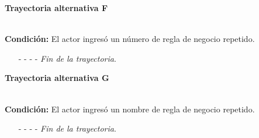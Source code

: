 \hypertarget{CU8-1:TAF}{\textbf{Trayectoria alternativa F}}\\
\noindent \textbf{Condición:} El actor ingresó un número de regla de negocio repetido.
\begin{enumerate}
	\UCpaso[\UCsist] Muestra el mensaje  señalando el campo que presenta la duplicidad en la pantalla .
	\UCpaso Regresa al paso \ref{CU8.1-P3} de la trayectoria principal.
	\item[- -] - - {\em {Fin de la trayectoria}}.
\end{enumerate}

\hypertarget{CU8-1:TAG}{\textbf{Trayectoria alternativa G}}\\
\noindent \textbf{Condición:} El actor ingresó un nombre de regla de negocio repetido.
\begin{enumerate}
	\UCpaso[\UCsist] Muestra el mensaje  señalando el campo que presenta la duplicidad en la pantalla .
	\UCpaso Regresa al paso \ref{CU8.1-P3} de la trayectoria principal.
	\item[- -] - - {\em {Fin de la trayectoria}}.
\end{enumerate}
